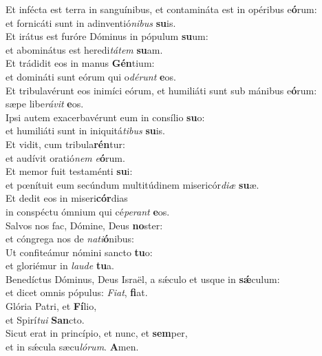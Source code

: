\oddverse Et infécta est terra in sanguínibus, et contamináta est in opéribus e\textbf{ó}rum:~\*\\
\oddverse et fornicáti sunt in adinventió\textit{ni}\textit{bus} \textbf{su}is.\\
\evenverse Et irátus est furóre Dóminus in pópulum \textbf{su}um:~\*\\
\evenverse et abominátus est heredi\textit{tá}\textit{tem} \textbf{su}am.\\
\oddverse Et trádidit eos in manus \textbf{Gén}tium:~\*\\
\oddverse et domináti sunt eórum qui o\textit{dé}\textit{runt} \textbf{e}os.\\
\evenverse Et tribulavérunt eos inimíci eórum, et humiliáti sunt sub mánibus e\textbf{ó}rum:~\*\\
\evenverse sæpe libe\textit{rá}\textit{vit} \textbf{e}os.\\
\oddverse Ipsi autem exacerbavérunt eum in consílio \textbf{su}o:~\*\\
\oddverse et humiliáti sunt in iniquitá\textit{ti}\textit{bus} \textbf{su}is.\\
\evenverse Et vidit, cum tribula\textbf{rén}tur:~\*\\
\evenverse et audívit oratió\textit{nem} \textit{e}\textbf{ó}rum.\\
\oddverse Et memor fuit testaménti \textbf{su}i:~\*\\
\oddverse et pœnítuit eum secúndum multitúdinem misericór\textit{di}\textit{æ} \textbf{su}æ.\\
\evenverse Et dedit eos in miseri\textbf{cór}dias~\*\\
\evenverse in conspéctu ómnium qui cé\textit{pe}\textit{rant} \textbf{e}os.\\
\oddverse Salvos nos fac, Dómine, Deus \textbf{no}ster:~\*\\
\oddverse et cóngrega nos de \textit{na}\textit{ti}\textbf{ó}nibus:\\
\evenverse Ut confiteámur nómini sancto \textbf{tu}o:~\*\\
\evenverse et gloriémur in \textit{lau}\textit{de} \textbf{tu}a.\\
\oddverse Benedíctus Dóminus, Deus Israël, a sǽculo et usque in \textbf{sǽ}culum:~\*\\
\oddverse et dicet omnis pópulus: \textit{Fi}\textit{at}, \textbf{fi}at.\\
\evenverse Glória Patri, et \textbf{Fí}lio,~\*\\
\evenverse et Spirí\textit{tu}\textit{i} \textbf{San}cto.\\
\oddverse Sicut erat in princípio, et nunc, et \textbf{sem}per,~\*\\
\oddverse et in sǽcula sæcu\textit{ló}\textit{rum}. \textbf{A}men.\\
